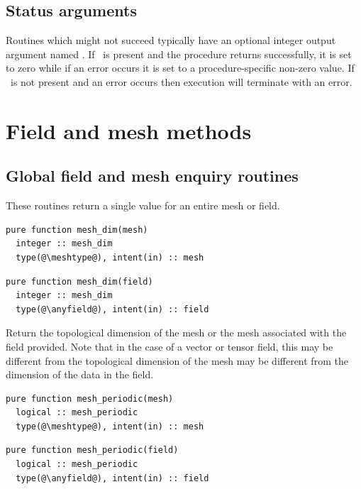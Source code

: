 \documentclass[a4paper, 11pt]{book}
\newcommand{\targetlabel}[1]{\hypertarget{#1}{}\label{#1}}
\begin{document}
\section{Status arguments}

Routines which might not succeed typically have an optional integer output
argument named \stat. If \stat\ is present and the procedure returns
successfully, it is set to zero while if an error occurs it is set to a
procedure-specific non-zero value. If \stat\ is not present and an error
occurs then execution will terminate with an error.


\chapter{Field and mesh methods}\targetlabel{chap:fieldmeshmethods}


\section{Global field and mesh enquiry routines}

These routines return a single value for an entire mesh or field.


\begin{lstlisting}
pure function mesh_dim(mesh)
  integer :: mesh_dim
  type(@\meshtype@), intent(in) :: mesh
\end{lstlisting}

\begin{lstlisting}
pure function mesh_dim(field)
  integer :: mesh_dim
  type(@\anyfield@), intent(in) :: field
\end{lstlisting}

Return the topological dimension of the mesh or the mesh associated with the
field provided. Note that in the case of a vector or tensor field, this may
be different from the topological dimension of the mesh may be different
from the dimension of the data in the field.


\begin{lstlisting}
pure function mesh_periodic(mesh)
  logical :: mesh_periodic
  type(@\meshtype@), intent(in) :: mesh
\end{lstlisting}

\begin{lstlisting}
pure function mesh_periodic(field)
  logical :: mesh_periodic
  type(@\anyfield@), intent(in) :: field
\end{lstlisting}
\end{document}
